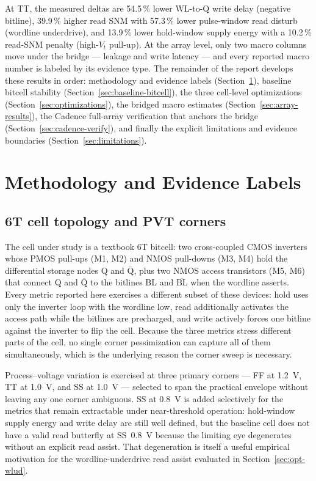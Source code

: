 \documentclass[pdflatex,sn-mathphys-num]{sn-jnl}%
\theoremstyle{thmstyleone}%
\theoremstyle{thmstyletwo}%
\theoremstyle{thmstylethree}%
\begin{document}
At TT, the measured deltas are 54.5\,\% lower WL-to-Q write delay (negative bitline), 39.9\,\% higher read SNM with 57.3\,\% lower pulse-window read disturb (wordline underdrive), and 13.9\,\% lower hold-window supply energy with a 10.2\,\% read-SNM penalty (high-$V_t$ pull-up). At the array level, only two macro columns move under the bridge — leakage and write latency — and every reported macro number is labeled by its evidence type. The remainder of the report develops these results in order: methodology and evidence labels (Section~\ref{sec:setup}), baseline bitcell stability (Section~\ref{sec:baseline-bitcell}), the three cell-level optimizations (Section~\ref{sec:optimizations}), the bridged macro estimates (Section~\ref{sec:array-results}), the Cadence full-array verification that anchors the bridge (Section~\ref{sec:cadence-verify}), and finally the explicit limitations and evidence boundaries (Section~\ref{sec:limitations}).

\section{Methodology and Evidence Labels}\label{sec:setup}

\subsection{6T cell topology and PVT corners}\label{sec:setup-topology}

The cell under study is a textbook 6T bitcell: two cross-coupled CMOS inverters whose PMOS pull-ups (M1, M2) and NMOS pull-downs (M3, M4) hold the differential storage nodes Q and $\overline{\mathrm{Q}}$, plus two NMOS access transistors (M5, M6) that connect Q and $\overline{\mathrm{Q}}$ to the bitlines BL and $\overline{\mathrm{BL}}$ when the wordline asserts. Every metric reported here exercises a different subset of these devices: hold uses only the inverter loop with the wordline low, read additionally activates the access path while the bitlines are precharged, and write actively forces one bitline against the inverter to flip the cell. Because the three metrics stress different parts of the cell, no single corner pessimization can capture all of them simultaneously, which is the underlying reason the corner sweep is necessary.

Process--voltage variation is exercised at three primary corners — FF at 1.2~V, TT at 1.0~V, and SS at 1.0~V — selected to span the practical envelope without leaving any one corner ambiguous. SS at 0.8~V is added selectively for the metrics that remain extractable under near-threshold operation: hold-window supply energy and write delay are still well defined, but the baseline cell does not have a valid read butterfly at SS~0.8~V because the limiting eye degenerates without an explicit read assist. That degeneration is itself a useful empirical motivation for the wordline-underdrive read assist evaluated in Section~\ref{sec:opt-wlud}.
\end{document}
